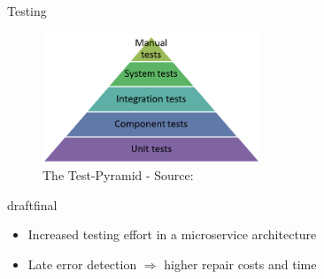 \documentclass{beamer}
\def\final{final}
\def\status{draft}
\begin{document}
\begin{frame}{}
  \vspace{-0.5cm}
  \begin{center}
    \Large Testing
  \end{center}

  \vspace{-0.5cm}
  \begin{figure}
    \includegraphics[width=0.58\textwidth]{img/tests-pyramid.png}
    \caption{\footnotesize The Test-Pyramid - \textcolor{uos-grey-full}{Source: {\cite{microtest}}}}
  \end{figure}
  \vspace{-0.2cm}

  \ifx\status\final{}
    \pause{}
  \fi


  \begin{block}{}
    \begin{itemize}
      \small
      \setlength\itemsep{0em}
      \item Increased testing effort in a microservice architecture
      \item Late error detection \(\Rightarrow \) higher repair costs and time
    \end{itemize}
  \end{block}
\end{frame}
\end{document}
